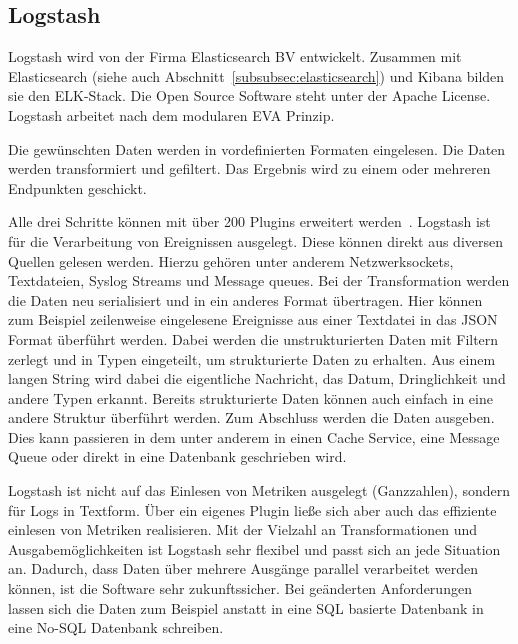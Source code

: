 \subsection{Logstash}
Logstash wird von der Firma Elasticsearch BV entwickelt. Zusammen mit
Elasticsearch (siehe auch Abschnitt~\ref{subsubsec:elasticsearch}) und
\gls{Kibana} bilden sie den ELK-Stack. Die Open Source Software steht unter der
Apache License. Logstash arbeitet nach dem modularen \gls{EVA} Prinzip.

\begin{outline}
  \1 Die gewünschten Daten werden in vordefinierten Formaten eingelesen.
  \1 Die Daten werden transformiert und gefiltert.
  \1 Das Ergebnis wird zu einem oder mehreren Endpunkten geschickt.
\end{outline}

Alle drei Schritte können mit über 200 Plugins erweitert
werden~\cite{logstash_overview}. Logstash ist für die Verarbeitung von
Ereignissen ausgelegt. Diese können direkt aus diversen Quellen gelesen werden.
Hierzu gehören unter anderem Netzwerksockets, Textdateien, Syslog Streams und
Message queues. Bei der Transformation werden die Daten neu serialisiert und in
ein anderes Format übertragen. Hier können zum Beispiel zeilenweise eingelesene
Ereignisse aus einer Textdatei in das \gls{JSON} Format überführt werden. Dabei
werden die unstrukturierten Daten mit Filtern zerlegt und in Typen eingeteilt,
um strukturierte Daten zu erhalten. Aus einem langen String wird dabei die
eigentliche Nachricht, das Datum, Dringlichkeit und andere Typen erkannt.
Bereits strukturierte Daten können auch einfach in eine andere Struktur
überführt werden. Zum Abschluss werden die Daten ausgeben. Dies kann passieren
in dem unter anderem in einen Cache Service, eine Message Queue oder direkt in
eine Datenbank geschrieben wird.

Logstash ist nicht auf das Einlesen von Metriken ausgelegt (Ganzzahlen),
sondern für Logs in Textform. Über ein eigenes Plugin ließe sich aber auch das
effiziente einlesen von Metriken realisieren. Mit der Vielzahl an
Transformationen und Ausgabemöglichkeiten ist Logstash sehr flexibel und passt
sich an jede Situation an. Dadurch, dass Daten über mehrere Ausgänge parallel
verarbeitet werden können, ist die Software sehr zukunftssicher. Bei geänderten
Anforderungen lassen sich die Daten zum Beispiel anstatt in eine SQL basierte
Datenbank in eine No-SQL Datenbank schreiben.
\tm%

